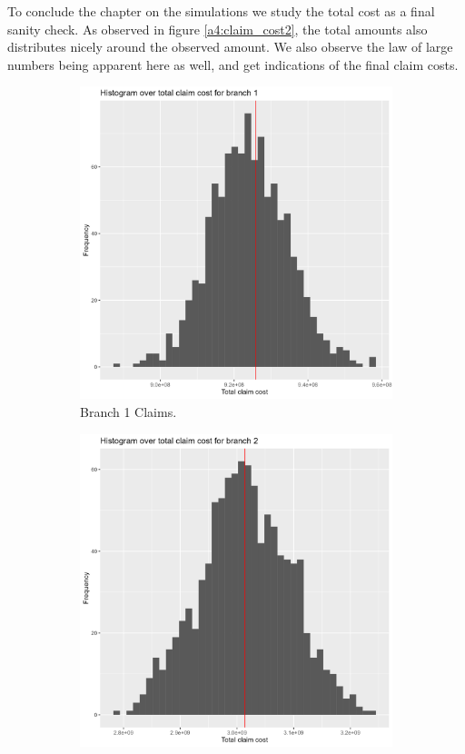 \documentclass[11pt]{article}
\begin{document}
To conclude the chapter on the simulations we study the total cost as a final sanity check.
As observed in figure \ref{a4:claim_cost2}, the total amounts also distributes nicely around the observed amount.
We also observe the law of large numbers being apparent here as well, and get indications of the final claim costs.

 \begin{figure}[!h]
\centering
    \begin{subfigure}{.33\textwidth}
      \centering
      \includegraphics[width=.9\linewidth]{plots/simulation/histogram_total_claim_cost1.png}
      \caption{Branch 1 Claims.}
    \end{subfigure}%
    \begin{subfigure}{.33\textwidth}
      \centering
      \includegraphics[width=.9\linewidth]{plots/simulation/histogram_total_claim_cost2.png}

\end{subfigure}
\end{figure}
\end{document}
